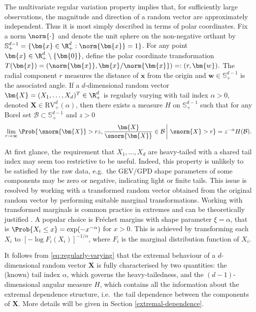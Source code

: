 \documentclass[en-GB, a4paper, nobind]{templates/bathreport}
\begin{document}
The multivariate regular variation property implies that, for sufficiently large observations, the magnitude and direction of a random vector are approximately independent. Thus it is most simply described in terms of polar coordinates. Fix a norm \(\norm{\cdot}\) and denote the unit sphere on the non-negative orthant by \(\mathbb{S}_+^{d-1}=\{\bm{x}\in\R^d_+:\norm{\bm{x}}=1\}\). For any point \(\bm{x}\in\R^d_+\setminus\{\bm{0}\}\), define the polar coordinate transformation \(T(\bm{x})=(\norm{\bm{x}}, \bm{x}/\norm{\bm{x}})=:(r,\bm{w}).\) The radial component \(r\) measures the distance of \(\bm{x}\) from the origin and \(\bm{w}\in\mathbb{S}_+^{d-1}\) is the associated angle. If a \(d\)-dimensional random vector \(\bm{X}=(X_1,\ldots,X_d)^T\in\R^d_+\) is regularly varying with tail index \(\alpha>0\), denoted \(\bm{X}\in\mathrm{RV}^d_+(\alpha)\), then there exists a measure \(H\) on \(\mathbb{S}_+^{d-1}\) such that for any Borel set \(\mathcal{B}\subset\mathbb{S}_+^{d-1}\) and \(z>0\)
\begin{equation}
\lim_{r\to\infty} \Prob{\left. \snorm{\bm{X}}>rz, \frac{\bm{X}}{\snorm{\bm{X}}}\in\mathcal{B} \, \right| \, \snorm{X}>r} = z^{-\alpha} H(\mathcal{B}).
\label{eq:regularly-varying}
\end{equation}

At first glance, the requirement that \(X_1,\ldots,X_d\) are heavy-tailed with a shared tail index may seem too restrictive to be useful. Indeed, this property is unlikely to be satisfied by the raw data, e.g.~the GEV/GPD shape parameters of some components may be zero or negative, indicating light or finite tails. This issue is resolved by working with a transformed random vector obtained from the original random vector by performing suitable marginal transformations. Working with transformed marginals is common practice in extremes and can be theoretically justified \autocite[p.~265]{resnickExtremeValuesRegular1987}. A popular choice is Fréchet margins with shape parameter \(\xi=\alpha\), that is \(\Prob{X_i\leq x}=\exp(-x^{-\alpha})\) for \(x>0\). This is achieved by transforming each \(X_i\) to \([-\log F_i(X_i)]^{-1/\alpha}\), where \(F_i\) is the marginal distribution function of \(X_i\).

It follows from \eqref{eq:regularly-varying} that the extremal behaviour of a \(d\)-dimensional random vector \(\bm{X}\) is fully characterised by two quantities: the (known) tail index \(\alpha\), which governs the heavy-tailedness, and the \((d-1)\)-dimensional angular measure \(H\), which contains all the information about the extremal dependence structure, i.e.~the tail dependence between the components of \(\bm{X}\). More details will be given in Section \ref{extremal-dependence}.
\end{document}
